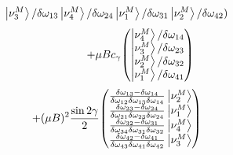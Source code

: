 \documentclass[10pt]{beamer}
\begin{document}
\begin{frame}[noframenumbering]
\begin{minipage}{0.45\textwidth}
\begin{equation*}
                    \ket{\nu^{M}_{3}}/\delta \omega_{13} \\
                    \ket{\nu^{M}_{4}}/\delta \omega_{24} \\
                    \ket{\nu^{M}_{1}}/\delta \omega_{31} \\
                    \ket{\nu^{M}_{2}}/\delta \omega_{42})
        \end{equation*}
            \begin{equation*}
            \hspace{1.5cm}+ \mu B c_{\gamma} \mqty(
            \ket{\nu^{M}_{4}}/\delta \omega_{14} \\
            \ket{\nu^{M}_{3}}/\delta \omega_{23} \\
            \ket{\nu^{M}_{2}}/\delta \omega_{32} \\
            \ket{\nu^{M}_{1}}/\delta \omega_{41})
        \end{equation*}
        \begin{equation*}
            + (\mu B)^{2} \frac{\sin 2\gamma}{2} \mqty(\frac{\delta \omega_{13} - 
            \delta \omega_{14}}{\delta \omega_{12} \delta \omega_{13} 
            \delta \omega_{14}} \ket{\nu^{M}_{2}} \\
            \frac{\delta \omega_{23} - \delta \omega_{24}}{\delta \omega_{21} 
            \delta \omega_{23} \delta \omega_{24}} \ket{\nu^{M}_{1}} \\
            \frac{\delta \omega_{32} - \delta \omega_{31}}{\delta \omega_{34} 
            \delta \omega_{31} \delta \omega_{32}} \ket{\nu^{M}_{4}} \\
            \frac{\delta \omega_{42} - \delta \omega_{41}}{\delta \omega_{43} 
            \delta \omega_{41} \delta \omega_{42}} \ket{\nu^{M}_{3}})
        \end{equation*}
        \normalsize
    \end{minipage}
\end{frame}
\end{document}
